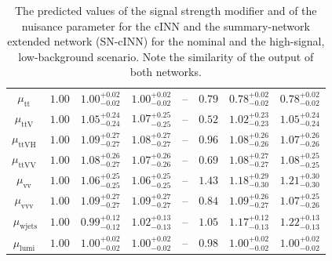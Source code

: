 \begin{table}[h!]
\begin{tabular}{cccccccc}
		$\mu_\text{tt   } $ & $1.00$ & $1.00^{+0.02}_{-0.02}$ & $1.00^{+0.02}_{-0.02}$ & --                        & $0.79 $ & $0.78^{+0.02}_{-0.02}$  & $0.78^{+0.02}_{-0.02}$  \\[0.3em]
		$\mu_\text{ttV  } $ & $1.00$ & $1.05^{+0.24}_{-0.24}$ & $1.07^{+0.25}_{-0.25}$ & --                        & $0.52 $ & $1.02^{+0.23}_{-0.23}$  & $1.05^{+0.24}_{-0.24}$  \\[0.3em]
		$\mu_\text{ttVH } $ & $1.00$ & $1.09^{+0.27}_{-0.27}$ & $1.08^{+0.27}_{-0.27}$ & --                        & $0.96 $ & $1.08^{+0.26}_{-0.26}$  & $1.07^{+0.26}_{-0.26}$  \\[0.3em]
		$\mu_\text{ttVV } $ & $1.00$ & $1.08^{+0.26}_{-0.27}$ & $1.07^{+0.26}_{-0.26}$ & --                        & $0.69 $ & $1.08^{+0.27}_{-0.27}$  & $1.08^{+0.25}_{-0.25}$  \\[0.3em]
		$\mu_\text{vv   } $ & $1.00$ & $1.06^{+0.25}_{-0.25}$ & $1.06^{+0.25}_{-0.25}$ & --                        & $1.43 $ & $1.18^{+0.29}_{-0.30}$  & $1.21^{+0.30}_{-0.30}$  \\[0.3em]
		$\mu_\text{vvv  } $ & $1.00$ & $1.09^{+0.27}_{-0.27}$ & $1.09^{+0.27}_{-0.27}$ & --                        & $0.84 $ & $1.09^{+0.26}_{-0.27}$  & $1.07^{+0.25}_{-0.26}$  \\[0.3em]
		$\mu_\text{wjets} $ & $1.00$ & $0.99^{+0.12}_{-0.12}$ & $1.02^{+0.13}_{-0.13}$ & --                        & $1.05 $ & $1.17^{+0.12}_{-0.13}$  & $1.22^{+0.13}_{-0.13}$  \\[0.3em]
		$\mu_\text{lumi } $ & $1.00$ & $1.00^{+0.02}_{-0.02}$ & $1.00^{+0.02}_{-0.02}$ & --                        & $0.98 $ & $1.00^{+0.02}_{-0.02}$  & $1.00^{+0.02}_{-0.02}$  \\[0.3em]
		\hline
	\end{tabular}
	\caption{The predicted values of the signal strength modifier and of the nuisance parameter for the cINN and the summary-network extended network (SN-cINN) for the nominal and the high-signal, low-background scenario. Note the similarity of the output of both networks.}
	\label{tab:inference_res}
\end{table}

